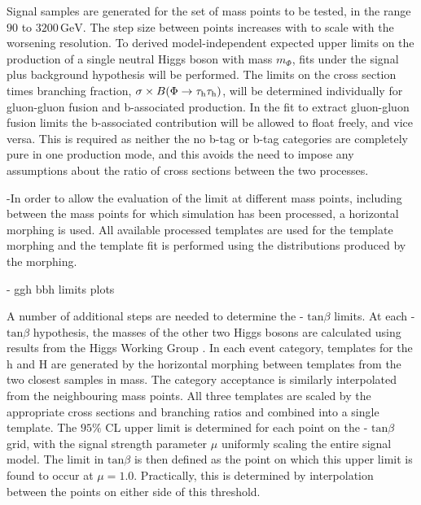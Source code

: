 Signal samples are generated for the set of \ma mass points to be tested, in the range $90$ to $3200\,\mathrm{GeV}$. The step size between points increases with \ma to scale with the worsening \mttot resolution. To derived model-independent expected upper limits on the production of a single neutral Higgs boson with mass $m_{\Phi}$, fits under the signal plus background hypothesis will be performed. The limits on the cross section times branching fraction, $\sigma\times B(\Phi\rightarrow\tau_{\rm h}\tau_{\rm h})$, will be determined individually for gluon-gluon fusion and b-associated production. In the fit to extract gluon-gluon fusion limits the b-associated contribution will be allowed to float freely, and vice versa. This is required as neither the no b-tag or b-tag categories are completely pure in one production mode, and this avoids the need to impose any assumptions about the ratio of cross sections between the two processes.

-In order to allow the evaluation of the limit at different mass points, including between the mass points for which simulation has been processed, a horizontal morphing \cite{READ1999357} is used. All available processed templates are used for the template morphing and the template fit is performed using the distributions produced by the morphing.

- ggh bbh limits plots




A number of additional steps are needed to determine the \ma -  $\mathrm{tan}\beta$ limits. At each \ma -  $\mathrm{tan}\beta$ hypothesis, the masses of the other two Higgs bosons are calculated using results from the Higgs Working Group \cite{Dittmaier:1318996}. In each event category, templates for the h and H are generated by the horizontal morphing \cite{READ1999357} between templates from the two closest samples in mass. The category acceptance is similarly interpolated from the neighbouring mass points. All three templates are scaled by the appropriate cross sections and branching ratios and combined into a single template. The $95\%$ CL upper limit is determined for each point on the \ma -  $\mathrm{tan}\beta$ grid, with the signal strength parameter $\mu$ uniformly scaling the entire signal model. The limit in  $\mathrm{tan}\beta$ is then defined as the point on which this upper limit is found to occur at $\mu = 1.0$. Practically, this is determined by interpolation between the points on either side of this threshold.

